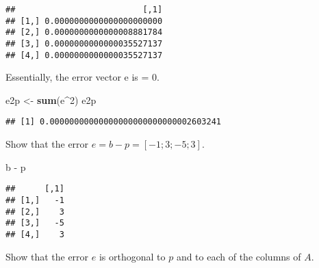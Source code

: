 \documentclass[]{article}
\newenvironment{Shaded}{\begin{snugshade}}{\end{snugshade}}
\newcommand{\KeywordTok}[1]{\textcolor[rgb]{0.13,0.29,0.53}{\textbf{{#1}}}}
\newcommand{\DataTypeTok}[1]{\textcolor[rgb]{0.13,0.29,0.53}{{#1}}}
\newcommand{\DecValTok}[1]{\textcolor[rgb]{0.00,0.00,0.81}{{#1}}}
\newcommand{\StringTok}[1]{\textcolor[rgb]{0.31,0.60,0.02}{{#1}}}
\newcommand{\NormalTok}[1]{{#1}}
\begin{document}
\begin{Shaded}
\end{Shaded}

\begin{verbatim}
##                          [,1]
## [1,] 0.0000000000000000000000
## [2,] 0.0000000000000008881784
## [3,] 0.0000000000000035527137
## [4,] 0.0000000000000035527137
\end{verbatim}

Essentially, the error vector e is = 0.

\begin{Shaded}
\begin{Highlighting}[]
\NormalTok{e2p <-}\StringTok{ }\KeywordTok{sum}\NormalTok{(e^}\DecValTok{2}\NormalTok{)}
\NormalTok{e2p}
\end{Highlighting}
\end{Shaded}

\begin{verbatim}
## [1] 0.00000000000000000000000000002603241
\end{verbatim}

Show that the error \(e = b - p = [-1;3;-5;3]\).

\begin{Shaded}
\begin{Highlighting}[]
\NormalTok{b -}\StringTok{ }\NormalTok{p}
\end{Highlighting}
\end{Shaded}

\begin{verbatim}
##      [,1]
## [1,]   -1
## [2,]    3
## [3,]   -5
## [4,]    3
\end{verbatim}

Show that the error \(e\) is orthogonal to \(p\) and to each of the
columns of \(A\).
\end{document}
